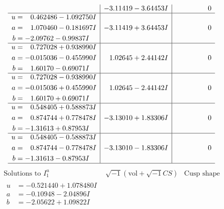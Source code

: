 \documentclass[1p]{elsarticle_modified}
\theoremstyle{definition}
\newcommand{\I}{\sqrt{-1}}
\begin{document}
$$\begin{array}{c|c|c}
 & -3.11419 - 3.64453 I & \phantom{-0.000000 } 0 \\ \hline\begin{aligned}
u &= \phantom{-}0.462486 - 1.092750 I \\
a &= \phantom{-}1.070460 - 0.181697 I \\
b &= -2.09762 - 0.99837 I\end{aligned}
 & -3.11419 + 3.64453 I & \phantom{-0.000000 } 0 \\ \hline\begin{aligned}
u &= \phantom{-}0.727028 + 0.938990 I \\
a &= -0.015036 - 0.455990 I \\
b &= \phantom{-}1.60170 - 0.69071 I\end{aligned}
 & \phantom{-}1.02645 + 2.44142 I & \phantom{-0.000000 } 0 \\ \hline\begin{aligned}
u &= \phantom{-}0.727028 - 0.938990 I \\
a &= -0.015036 + 0.455990 I \\
b &= \phantom{-}1.60170 + 0.69071 I\end{aligned}
 & \phantom{-}1.02645 - 2.44142 I & \phantom{-0.000000 } 0 \\ \hline\begin{aligned}
u &= \phantom{-}0.548405 + 0.588873 I \\
a &= \phantom{-}0.874744 + 0.778478 I \\
b &= -1.31613 + 0.87953 I\end{aligned}
 & -3.13010 + 1.83306 I & \phantom{-0.000000 } 0 \\ \hline\begin{aligned}
u &= \phantom{-}0.548405 - 0.588873 I \\
a &= \phantom{-}0.874744 - 0.778478 I \\
b &= -1.31613 - 0.87953 I\end{aligned}
 & -3.13010 - 1.83306 I & \phantom{-0.000000 } 0\\
 \hline 
 \end{array}$$\newpage$$\begin{array}{c|c|c}  
\text{Solutions to }I^u_{1}& \I (\text{vol} + \sqrt{-1}CS) & \text{Cusp shape}\\
 \hline 
\begin{aligned}
u &= -0.521440 + 1.078480 I \\
a &= -0.10948 - 2.04896 I \\
b &= -2.05622 + 1.09822 I\end{aligned}

\end{array}$$
\end{document}
